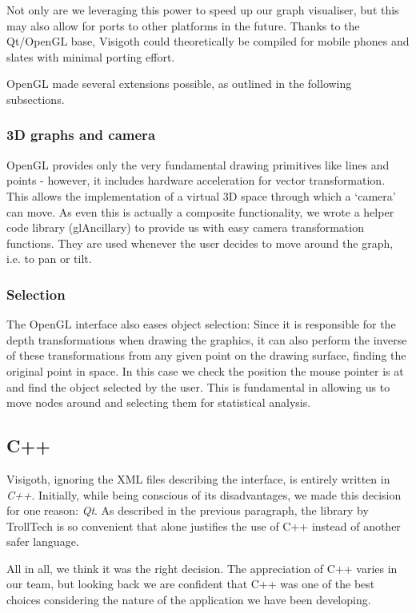 \documentclass[a4paper,11pt,titlepage]{article}
\newcommand{\buzz}[1]{\emph{#1}}
\begin{document}
Not only are we leveraging this power to speed up our graph
visualiser, but this may also allow for ports to other
platforms in the future. Thanks to the Qt/OpenGL base, Visigoth
could theoretically be compiled for mobile phones and slates
with minimal porting effort.

OpenGL made several extensions possible, as outlined in the following
subsections.

\subsubsection{3D graphs and camera}
OpenGL provides only the very fundamental drawing primitives like
lines and points - however, it includes hardware acceleration for
vector transformation. This allows the implementation of a virtual
3D space through which a `camera' can move. As even this is actually
a composite functionality, we wrote a helper code library (glAncillary)
to provide us with easy camera transformation functions. They are
used whenever the user decides to move around the graph, i.e. to
pan or tilt.

\subsubsection{Selection}
The OpenGL interface also eases object selection: Since it is
responsible for the depth transformations when drawing the graphics,
it can also perform the inverse of these transformations from any
given point on the drawing surface, finding the original point
in space. In this case we check the position the mouse pointer is at
and find the object selected by the user. This is fundamental in
allowing us to move nodes around and selecting them for statistical
analysis.

\subsection{C++}

Visigoth, ignoring the XML files describing the interface, is entirely
written in \buzz{C++}. Initially, while being conscious of its disadvantages,
we made this decision for one reason: \buzz{Qt}. As described in the previous
paragraph, the library by TrollTech is so convenient that alone
justifies the use of C++ instead of another safer language.

All in all, we think it was the right decision. The appreciation of
C++ varies in our team, but looking back we are confident that C++ was
one of the best choices considering the nature of the application we
have been developing.
\end{document}
